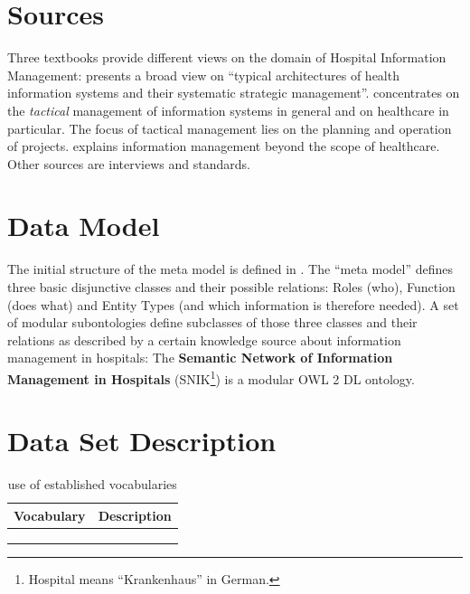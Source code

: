 \documentclass[sw]{iosart2x}
\renewcommand{\citet}{\cite}%
\renewcommand{\citep}{\cite}%
\begin{document}
\section{Sources}\label{sec:sources}
Three textbooks provide different views on the domain of Hospital Information Management:
\citet{bb} presents a broad view on \enquote{typical architectures of health information systems and their systematic strategic management}.
\citep{ob} concentrates on the \emph{tactical} management of information systems in general and on healthcare in particular.
The focus of tactical management lies on the planning and operation of projects.
\citet{he} explains information management beyond the scope of healthcare.
Other sources are interviews and standards.

\section{Data Model}\label{sec:architecture}
The initial structure of the meta model is defined in \citet{domaene}.
The \enquote{meta model} defines three basic disjunctive classes and their possible relations: Roles (who), Function (does what) and Entity Types (and which information is therefore needed).
A set of modular subontologies define subclasses of those three classes and their relations as described by a certain knowledge source about information management in hospitals:
The \textbf{Semantic Network of Information Management in Hospitals} (SNIK\footnote{Hospital means \enquote{Krankenhaus} in German.}) is a modular OWL 2 DL ontology.

\section{Data Set Description}\label{sec:dsd}
\begin{table}
\caption{use of established vocabularies}
\label{tab:templates}
\begin{tabulary}{\textwidth}{lL}
\toprule
\textbf{Vocabulary}	&\textbf{Description}\\
\midrule
&\\
&\\
&\\
\bottomrule
\end{tabulary}
\end{table}
\end{document}

